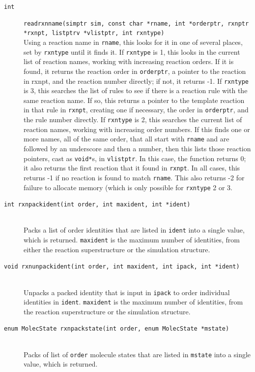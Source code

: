 \documentclass {scrbook}
\newcommand {\ttt} {\texttt}
\begin{document}
\begin{description}
\item[\ttt{int}]
\ttt{readrxnname(simptr sim, const char *rname, int *orderptr, rxnptr *rxnpt, listptrv *vlistptr, int rxntype)}
\hfill \\
Using a reaction name in \ttt{rname}, this looks for it in one of several places, set by \ttt{rxntype} until it finds it. If \ttt{rxntype} is 1, this looks in the current list of reaction names, working with increasing reaction orders. If it is found, it returns the reaction order in \ttt{orderptr}, a pointer to the reaction in rxnpt, and the reaction number directly; if not, it returns -1. If \ttt{rxntype} is 3, this searches the list of rules to see if there is a reaction rule with the same reaction name. If so, this returns a pointer to the template reaction in that rule in \ttt{rxnpt}, creating one if necessary, the order in \ttt{orderptr}, and the rule number directly. If \ttt{rxntype} is 2, this searches the current list of reaction names, working with increasing order numbers. If this finds one or more names, all of the same order, that all start with \ttt{rname} and are followed by an underscore and then a number, then this lists those reaction pointers, cast as \ttt{void*}s, in \ttt{vlistptr}. In this case, the function returns 0; it also returns the first reaction that it found in \ttt{rxnpt}. In all cases, this returns -1 if no reaction is found to match \ttt{rname}. This also returns -2 for failure to allocate memory (which is only possible for \ttt{rxntype} 2 or 3.

\item[\ttt{int rxnpackident(int order, int maxident, int *ident)}]
\hfill \\
Packs a list of order identities that are listed in \ttt{ident} into a single value, which is returned. \ttt{maxident} is the maximum number of identities, from either the reaction superstructure or the simulation structure.

\item[\ttt{void rxnunpackident(int order, int maxident, int ipack, int *ident)}]
\hfill \\
Unpacks a packed identity that is input in \ttt{ipack} to order individual identities in \ttt{ident}. \ttt{maxident} is the maximum number of identities, from the reaction superstructure or the simulation structure.

\item[\ttt{enum MolecState rxnpackstate(int order, enum MolecState *mstate)}]
\hfill \\
Packs of list of \ttt{order} molecule states that are listed in \ttt{mstate} into a single value, which is returned.


\end{description}
\end{document}
